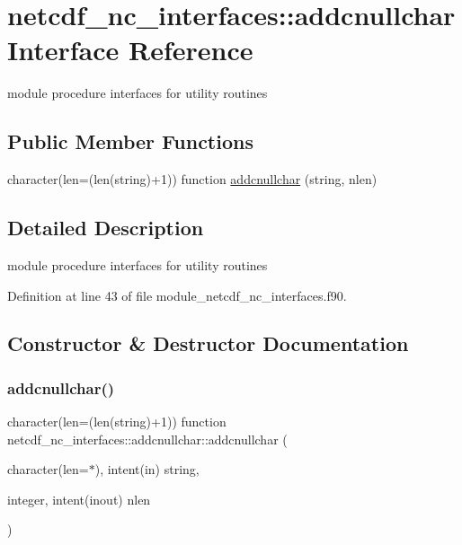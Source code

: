 \hypertarget{interfacenetcdf__nc__interfaces_1_1addcnullchar}{}\section{netcdf\+\_\+nc\+\_\+interfaces\+:\+:addcnullchar Interface Reference}
\label{interfacenetcdf__nc__interfaces_1_1addcnullchar}


module procedure interfaces for utility routines  


\subsection*{Public Member Functions}
\begin{DoxyCompactItemize}
\item 
character(len=(len(string)+1)) function \hyperlink{interfacenetcdf__nc__interfaces_1_1addcnullchar_a5e604dda0623adebfc7d57ef5b4a9cb5}{addcnullchar} (string, nlen)
\end{DoxyCompactItemize}


\subsection{Detailed Description}
module procedure interfaces for utility routines 

Definition at line 43 of file module\+\_\+netcdf\+\_\+nc\+\_\+interfaces.\+f90.



\subsection{Constructor \& Destructor Documentation}
\mbox{\label{interfacenetcdf__nc__interfaces_1_1addcnullchar_a5e604dda0623adebfc7d57ef5b4a9cb5}} 
\subsubsection{\texorpdfstring{addcnullchar()}{addcnullchar()}}
{\footnotesize\ttfamily character(len=(len(string)+1)) function netcdf\+\_\+nc\+\_\+interfaces\+::addcnullchar\+::addcnullchar (\begin{DoxyParamCaption}\item[{character(len=$\ast$), intent(in)}]{string,  }\item[{integer, intent(inout)}]{nlen }\end{DoxyParamCaption})}



